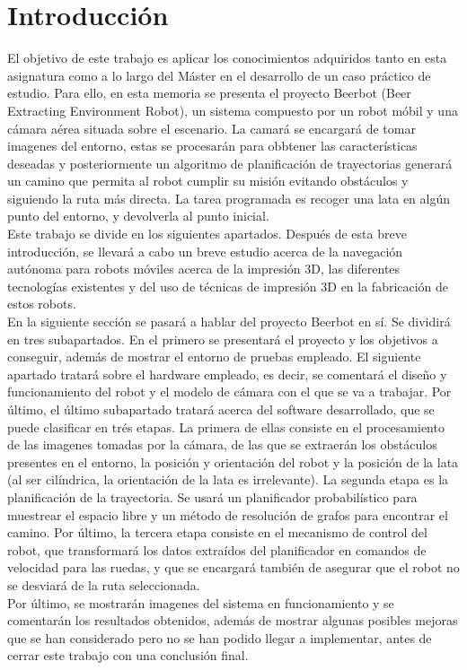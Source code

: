 \chapter{Introducción}
\label{introducción}

El objetivo de este trabajo es aplicar los conocimientos adquiridos tanto en esta asignatura como a lo largo del Máster en el desarrollo de un caso práctico de estudio. Para ello, en esta memoria se presenta el proyecto Beerbot (Beer Extracting Environment Robot), un sistema compuesto por un robot móbil y una cámara aérea situada sobre el escenario. La camará se encargará de tomar imagenes del entorno, estas se procesarán para obbtener las características deseadas y posteriormente un algoritmo de planificación de trayectorias generará un camino que permita al robot cumplir su misión evitando obstáculos y siguiendo la ruta más directa. La tarea programada es recoger una lata en algún punto del entorno, y devolverla al punto inicial.\\

Este trabajo se divide en los siguientes apartados. Después de esta breve introducción, se llevará a cabo un breve estudio acerca de la navegación autónoma para robots móviles acerca de la impresión 3D, las diferentes tecnologías existentes y del uso de técnicas de impresión 3D en la fabricación de estos robots.\\

En la siguiente sección se pasará a hablar del proyecto Beerbot en sí. Se dividirá en tres subapartados. En el primero se presentará el proyecto y los objetivos a conseguir, además de mostrar el entorno de pruebas empleado. El siguiente apartado tratará sobre el hardware empleado, es decir, se comentará el diseño y funcionamiento del robot y el modelo de cámara con el que se va a trabajar. Por último, el último subapartado tratará acerca del software desarrollado, que se puede clasificar en trés etapas. La primera de ellas consiste en el procesamiento de las imagenes tomadas por la cámara, de las que se extraerán los obstáculos presentes en el entorno, la posición y orientación del robot y la posición de la lata (al ser cilíndrica, la orientación de la lata es irrelevante). La segunda etapa es la planificación de la trayectoria. Se usará un planificador probabilístico para muestrear el espacio libre y un método de resolución de grafos para encontrar el camino. Por último, la tercera etapa consiste en el mecanismo de control del robot, que transformará los datos extraídos del planificador en comandos de velocidad para las ruedas, y que se encargará también de asegurar que el robot no se desviará de la ruta seleccionada.\\

Por último, se mostrarán imagenes del sistema en funcionamiento y se comentarán los resultados obtenidos, además de mostrar algunas posibles mejoras que se han considerado pero no se han podido llegar a implementar, antes de cerrar este trabajo con una conclusión final.\\
